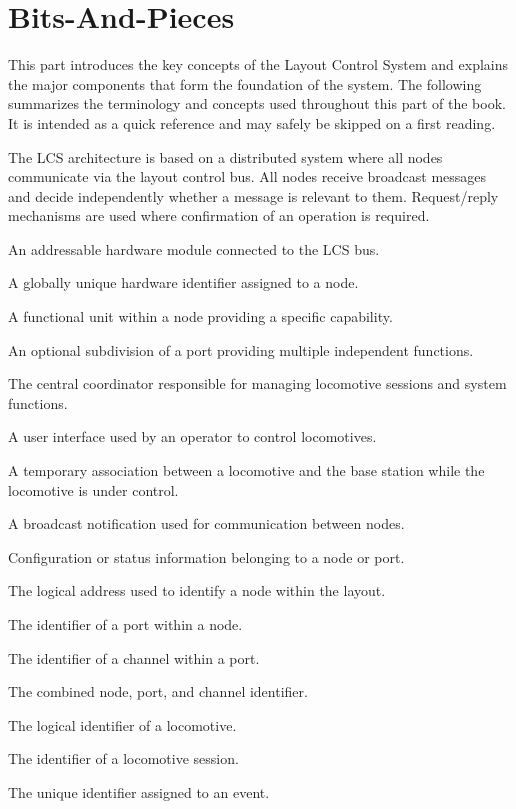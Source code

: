 \chapter{Bits-And-Pieces}



This part introduces the key concepts of the Layout Control System and explains the major components that form the foundation of the system. The following summarizes the terminology and concepts used throughout this part of the book. It is intended as a quick reference and may safely be skipped on a first reading.

The LCS architecture is based on a distributed system where all nodes communicate via the layout control bus. All nodes receive broadcast messages and decide independently whether a message is relevant to them. Request/reply mechanisms are used where confirmation of an operation is required.

\begin{tsDefinition}

      {An addressable hardware module connected to the LCS bus.}

      {A globally unique hardware identifier assigned to a node.}

      {A functional unit within a node providing a specific capability.}

      {An optional subdivision of a port providing multiple independent functions.}

      {The central coordinator responsible for managing locomotive sessions and system functions.}

      {A user interface used by an operator to control locomotives.}

      {A temporary association between a locomotive and the base station while the locomotive is under control.}

      {A broadcast notification used for communication between nodes.}

      {Configuration or status information belonging to a node or port.}

      {The logical address used to identify a node within the layout.}

      {The identifier of a port within a node.}

      {The identifier of a channel within a port.}

      {The combined node, port, and channel identifier.}

      {The logical identifier of a locomotive.}

      {The identifier of a locomotive session.}

      {The unique identifier assigned to an event.}

\end{tsDefinition}

